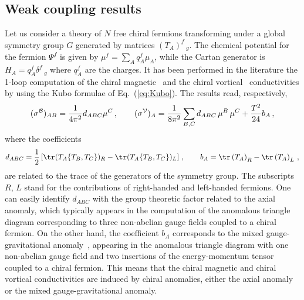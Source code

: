 \documentclass[a4paper]{jpconf}
\begin{document}
\subsection{Weak coupling results}
\label{subsec:weak_coupling}

Let us consider a theory of $N$ free chiral fermions transforming under a global symmetry group $G$ generated by matrices $(T_A)^f\,{}_g$. The chemical potential for the fermion $\Psi^f$ is given by $\mu^f= \sum_A q_A^f \mu_A$, while the Cartan generator is $H_A = q^f_A \delta^f\,{}_g$ where $q^f_A$ are the charges. It has been performed in the literature the 1-loop computation of the chiral magnetic~\cite{Kharzeev:2009pj} and the chiral vortical~\cite{Landsteiner:2011cp} conductivities by using the Kubo formulae of Eq.~(\ref{eq:Kubo}). The results read, respectively,
\begin{equation}
  (\sigma^{\cal B})_{AB} = \frac{1}{4\pi^2} d_{ABC} \mu^C  \,, \qquad (\sigma^{\cal V})_A = \frac{1}{8\pi^2}  \sum_{B,C} d_{ABC} \, \mu^B \, \mu^C  + \frac{T^2}{24} b_A \,, \label{eq:sigmaBV}
\end{equation}
where the coefficients
\begin{equation}
 d_{ABC} = \frac{1}{2} \left[ \tr( T_A \{ T_B, T_C \})_R - \tr( T_A \{ T_B, T_C \})_L \right] \,, \qquad   b_A =  \tr \left( T_A \right)_R -  \tr \left( T_A \right)_L   \,, \label{eq:db}
\end{equation}
are related to the trace of the generators of the symmetry group. The subscripts $R$, $L$ stand for the contributions of right-handed and left-handed fermions.  One can easily identify $d_{ABC}$ with the group theoretic factor related to the axial anomaly, which typically appears in the computation of the anomalous triangle diagram corresponding to three non-abelian gauge fields coupled to a chiral fermion.  On the other hand, the coefficient $b_A$ corresponds to the mixed gauge-gravitational anomaly~\cite{Kumura:1969wj}, appearing in the anomalous triangle diagram with one non-abelian gauge field and two insertions of the energy-momentum tensor coupled to a chiral fermion. This means that the chiral magnetic and chiral vortical conductivities are induced by chiral anomalies, either the axial anomaly or the mixed gauge-gravitational anomaly.
\end{document}
